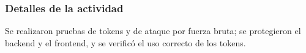 \subsubsection{Detalles de la actividad}
Se realizaron pruebas de tokens y de ataque por fuerza bruta; se protegieron el backend y el frontend, y se verificó el uso correcto de los tokens.




